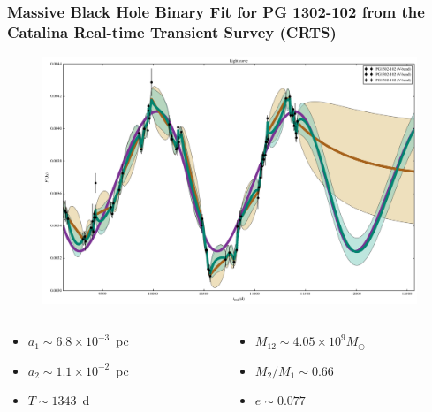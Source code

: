 \documentclass[hyperref={pdfpagelabels=false}]{beamer}
\begin{document}
\begin{frame}
\frametitle{Massive Black Hole Binary Fit for PG 1302-102 from the\\Catalina Real-time Transient Survey (CRTS)}
  \begin{figure}
    \includegraphics[scale=0.05]{images/PG1302-102_LC.jpg}
  \end{figure}
  \begin{columns}
  \centering
    \begin{column}{0.5\textwidth}
      \begin{itemize}
        \item {\scriptsize $a_{1} \sim 6.8 \times 10^{-3}$~pc}
        \item {\scriptsize $a_{2} \sim 1.1 \times 10^{-2}$~pc}
        \item {\scriptsize $T \sim 1343$~d}
      \end{itemize}
    \end{column}
    \begin{column}{0.5\textwidth}
      \begin{itemize}
        \item {\scriptsize $M_{12} \sim 4.05 \times 10^{9} M_{\odot}$}
        \item {\scriptsize $M_{2}/M_{1} \sim 0.66$}
        \item {\scriptsize $e \sim 0.077$}
      \end{itemize}
    \end{column}
  \end{columns}
\end{frame}

\appendix
\begin{frame}[allowframebreaks]
  
\end{frame}
\end{document}
